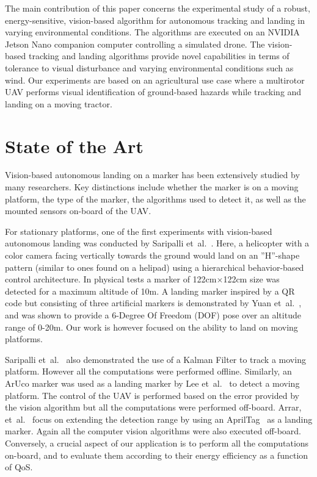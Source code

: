 \documentclass[conference]{IEEEtran}
\begin{document}
The main contribution of this paper concerns the experimental study of
a robust, energy-sensitive, vision-based algorithm for autonomous
tracking and landing in varying environmental conditions. The
algorithms are executed on an NVIDIA Jetson Nano companion computer
controlling a simulated drone. The vision-based tracking and landing
algorithms provide novel capabilities in terms of tolerance to visual
disturbance and varying environmental conditions such as wind.
%
Our experiments are based on an agricultural use case where a
multirotor UAV performs visual identification of ground-based hazards
while tracking and landing on a moving tractor.
%

\section{State of the Art}
\label{sec:state-of-the-art}

Vision-based autonomous landing on a marker has been extensively
studied by many researchers. Key distinctions include whether the
marker is on a moving platform, the type of the marker, the algorithms
used to detect it, as well as the mounted sensors on-board of the UAV.

For stationary platforms, one of the first experiments with
vision-based autonomous landing was conducted by Saripalli
et~al.~\cite{saripalli2002vision}. Here, a helicopter with a color
camera facing vertically towards the ground would land on an ”H”-shape
pattern (similar to ones found on a helipad) using a hierarchical
behavior-based control architecture. In physical tests a marker of
122cm$\times$122cm size was detected for a maximum altitude of 10m. A
landing marker inspired by a QR code but consisting of three
artificial markers is demonstrated by Yuan
et~al.~\cite{yuan2018hierarchical}, and was shown to provide a 6-Degree Of Freedom (DOF)
pose over an altitude range of 0-20m. Our work is however focused on
the ability to land on moving platforms.

Saripalli et~al.~\cite{saripalli2003landing} also demonstrated the use
of a Kalman Filter to track a moving platform. However all the
computations were performed offline. Similarly, an ArUco marker was
used as a landing marker by Lee et~al.~\cite{lee2012autonomous} to
detect a moving platform. The control of the UAV is performed based on
the error provided by the vision algorithm but all the computations
were performed off-board. Arrar, et~al.~\cite{araar2017vision} focus
on extending the detection range by using an
AprilTag~\cite{olson2011apriltag} as a landing marker. Again all the
computer vision algorithms were also executed off-board. Conversely, a crucial
aspect of our application is to perform all the computations on-board,
and to evaluate them according to their energy efficiency as a
function of QoS.
\end{document}
